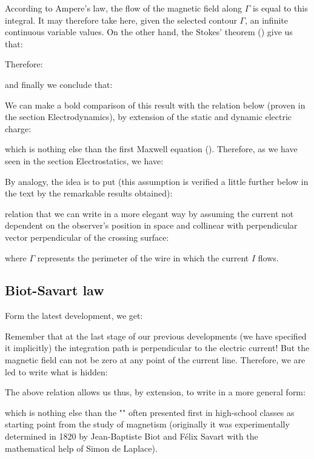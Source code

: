 	According to Ampere's law, the flow of the magnetic field along $\Gamma$ is equal to this integral. It may therefore take here, given the selected contour $\Gamma$, an infinite continuous variable values. On the other hand, the Stokes' theorem () give us that:
	
	Therefore:
	
	and finally we conclude that:
	
	We can make a bold comparison of this result with the relation below (proven in the section Electrodynamics), by extension of the static and dynamic electric charge:
	
	which is nothing else than the first Maxwell equation (). Therefore, as we have seen in the section Electrostatics, we have:
	
	By analogy, the idea is to put (this assumption is verified a little further below in the text by the remarkable results obtained):
	
	relation that we can write in a more elegant way by assuming the current not dependent on the observer's position in space and collinear with perpendicular vector perpendicular of the crossing surface:
	
	where $\Gamma$ represents the perimeter of the wire in which the current $I$ flows.
	
	\subsection{Biot-Savart law}\label{biot savart law}
	Form the latest development, we get:
	
	Remember that at the last stage of our previous developments (we have specified it implicitly) the integration path is perpendicular to the electric current! But the magnetic field can not be zero at any point of the current line. Therefore, we are led to write what is hidden:
	
	The above relation allows us thus, by extension, to write in a more general form:
	 
	which is nothing else than the "" often presented first in high-school classes as starting point from the study of magnetism (originally it was experimentally determined in 1820 by Jean-Baptiste Biot and Félix Savart with the mathematical help of Simon de Laplace).
	
